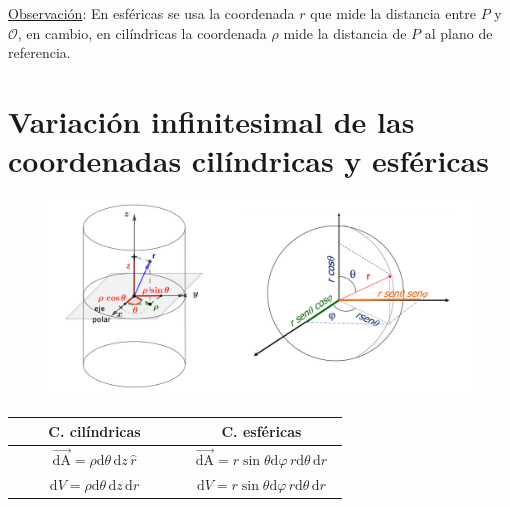 \underline{Observación}: En esféricas se usa la coordenada $r$ que mide la distancia entre $P$ y $\mathcal O$, en cambio, en cilíndricas la coordenada $\rho$ mide la distancia de $P$ al plano de referencia.



\vspace{1cm}
\section{Variación infinitesimal de las coordenadas cilíndricas y esféricas}
\vspace{0.5cm}

\begin{figure}[H]
	\centering
	\includegraphics[width=.95\textwidth]{img-coordenadas/coordenadas-14.png}
	\end{figure}

\begin{table}[H]
\centering
\begin{tabular}{|c|c|}
\hline
\textbf{$\qquad$ C.  cilíndricas $\qquad$ } & \textbf{$\qquad$  C. esféricas $\qquad$ } \\ \hline
	$\overrightarrow{\mathrm{dA}}=\rho \mathrm{d} \theta \, \mathrm{d} z\, \widehat r$  
&     $\overrightarrow{\mathrm{dA}}=r \sin \theta \mathrm{d} \varphi\, r \mathrm{d} \theta \, \mathrm{d} r$    \\ \hline
	$\mathrm{d}V=\rho \mathrm{d}\theta\, \mathrm{d} z\, \mathrm{d} r$        
&     $\mathrm{d}V=r\sin \theta \mathrm{d}\varphi\, r\mathrm{d}\theta\, \mathrm{d}r$   \\ \hline
\end{tabular}
\end{table}

